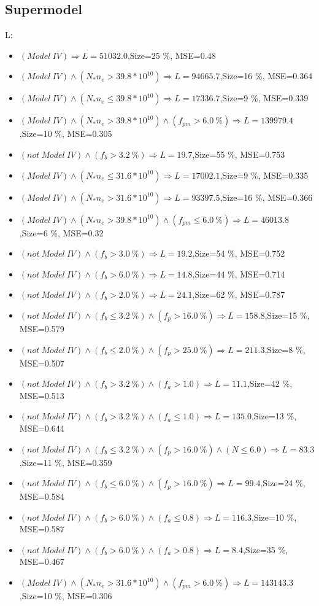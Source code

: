 \documentclass[numbered]{CSL}
\begin{document}
\subsection{Supermodel}
L:
\begin{itemize}
\item $(Model~IV) \Rightarrow L = 51032.0$,\hfill Size=25 \%, MSE=0.48
\item $(Model~IV) \land (N_* n_e > 39.8 * 10^{10}) \Rightarrow L = 94665.7$,\hfill Size=16 \%, MSE=0.364
\item $(Model~IV) \land (N_* n_e \leq 39.8 * 10^{10}) \Rightarrow L = 17336.7$,\hfill Size=9 \%, MSE=0.339
\item $(Model~IV) \land (N_* n_e > 39.8 * 10^{10}) \land (f_{pm} > 6.0~\%) \Rightarrow L = 139979.4$,\hfill Size=10 \%, MSE=0.305
\item $(not~Model~IV) \land (f_b > 3.2~\%) \Rightarrow L = 19.7$,\hfill Size=55 \%, MSE=0.753
\item $(Model~IV) \land (N_* n_e \leq 31.6 * 10^{10}) \Rightarrow L = 17002.1$,\hfill Size=9 \%, MSE=0.335
\item $(Model~IV) \land (N_* n_e > 31.6 * 10^{10}) \Rightarrow L = 93397.5$,\hfill Size=16 \%, MSE=0.366
\item $(Model~IV) \land (N_* n_e > 39.8 * 10^{10}) \land (f_{pm} \leq 6.0~\%) \Rightarrow L = 46013.8$,\hfill Size=6 \%, MSE=0.32
\item $(not~Model~IV) \land (f_b > 3.0~\%) \Rightarrow L = 19.2$,\hfill Size=54 \%, MSE=0.752
\item $(not~Model~IV) \land (f_b > 6.0~\%) \Rightarrow L = 14.8$,\hfill Size=44 \%, MSE=0.714
\item $(not~Model~IV) \land (f_b > 2.0~\%) \Rightarrow L = 24.1$,\hfill Size=62 \%, MSE=0.787
\item $(not~Model~IV) \land (f_b \leq 3.2~\%) \land (f_p > 16.0~\%) \Rightarrow L = 158.8$,\hfill Size=15 \%, MSE=0.579
\item $(not~Model~IV) \land (f_b \leq 2.0~\%) \land (f_p > 25.0~\%) \Rightarrow L = 211.3$,\hfill Size=8 \%, MSE=0.507
\item $(not~Model~IV) \land (f_b > 3.2~\%) \land (f_a > 1.0) \Rightarrow L = 11.1$,\hfill Size=42 \%, MSE=0.513
\item $(not~Model~IV) \land (f_b > 3.2~\%) \land (f_a \leq 1.0) \Rightarrow L = 135.0$,\hfill Size=13 \%, MSE=0.644
\item $(not~Model~IV) \land (f_b \leq 3.2~\%) \land (f_p > 16.0~\%) \land (N \leq 6.0) \Rightarrow L = 83.3$,\hfill Size=11 \%, MSE=0.359
\item $(not~Model~IV) \land (f_b \leq 6.0~\%) \land (f_p > 16.0~\%) \Rightarrow L = 99.4$,\hfill Size=24 \%, MSE=0.584
\item $(not~Model~IV) \land (f_b > 6.0~\%) \land (f_a \leq 0.8) \Rightarrow L = 116.3$,\hfill Size=10 \%, MSE=0.587
\item $(not~Model~IV) \land (f_b > 6.0~\%) \land (f_a > 0.8) \Rightarrow L = 8.4$,\hfill Size=35 \%, MSE=0.467
\item $(Model~IV) \land (N_* n_e > 31.6 * 10^{10}) \land (f_{pm} > 6.0~\%) \Rightarrow L = 143143.3$,\hfill Size=10 \%, MSE=0.306
\end{itemize}
\end{document}
